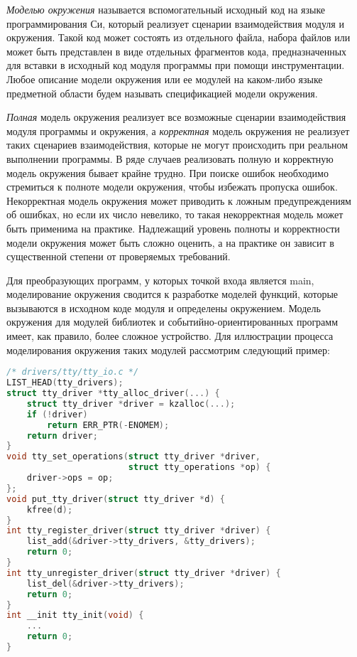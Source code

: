 \textit{Моделью окружения} называется вспомогательный исходный код на языке программирования Си, который реализует сценарии взаимодействия модуля и окружения.
Такой код может состоять из отдельного файла, набора файлов или может быть представлен в виде отдельных фрагментов кода, предназначенных для вставки в исходный код модуля программы при помощи инструментации.
Любое описание модели окружения или ее модулей на каком-либо языке предметной области будем называть спецификацией модели окружения.

\textit{Полная} модель окружения реализует все возможные сценарии взаимодействия модуля программы и окружения, а \textit{корректная} модель окружения не реализует таких сценариев взаимодействия, которые не могут происходить при реальном выполнении программы.
В ряде случаев реализовать полную и корректную модель окружения бывает крайне трудно.
При поиске ошибок необходимо стремиться к полноте модели окружения, чтобы избежать пропуска ошибок.
Некорректная модель окружения может приводить к ложным предупреждениям об ошибках, но если их число невелико, то такая некорректная модель может быть применима на практике.
Надлежащий уровень полноты и корректности модели окружения может быть сложно оценить, а на практике он зависит в существенной степени от проверяемых требований.

Для преобразующих программ, у которых точкой входа является main, моделирование окружения сводится к разработке моделей функций, которые вызываются в исходном коде модуля и определены окружением.
Модель окружения для модулей библиотек и событийно-ориентированных программ имеет, как правило, более сложное устройство.
Для иллюстрации процесса моделирования окружения таких модулей рассмотрим следующий пример:
\begin{lstlisting}[language=C,basicstyle=\small]
/* drivers/tty/tty_io.c */
LIST_HEAD(tty_drivers);
struct tty_driver *tty_alloc_driver(...) {
	struct tty_driver *driver = kzalloc(...);
	if (!driver)
		return ERR_PTR(-ENOMEM);
	return driver;
}
void tty_set_operations(struct tty_driver *driver, 
                        struct tty_operations *op) {
	driver->ops = op;
};
void put_tty_driver(struct tty_driver *d) {
	kfree(d);
}
int tty_register_driver(struct tty_driver *driver) {
	list_add(&driver->tty_drivers, &tty_drivers);
	return 0;
}
int tty_unregister_driver(struct tty_driver *driver) {
	list_del(&driver->tty_drivers);
	return 0;
}
int __init tty_init(void) {
	...
	return 0;
}
\end{lstlisting}

